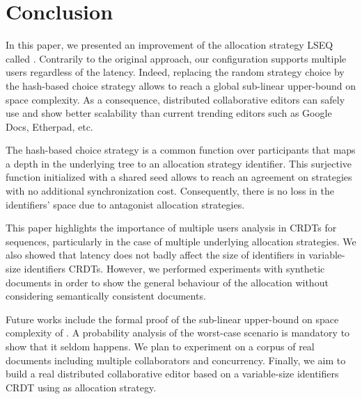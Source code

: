 
\section{Conclusion}

In this paper, we presented an improvement of the allocation strategy LSEQ
called \NAME{}. Contrarily to the original approach, our configuration supports
multiple users regardless of the latency. Indeed, replacing the random strategy
choice by the hash-based choice strategy allows to reach a global sub-linear
upper-bound on space complexity. As a consequence, distributed collaborative
editors can safely use \NAME{} and show better scalability than current
trending editors such as Google Docs, Etherpad, etc.

The hash-based choice strategy is a common function over participants that maps
a depth in the underlying tree to an allocation strategy identifier. This
surjective function initialized with a shared seed allows to reach an agreement
on strategies with no additional synchronization cost. Consequently, there is
no loss in the identifiers' space due to antagonist allocation strategies.

This paper highlights the importance of multiple users analysis in CRDTs for
sequences, particularly in the case of multiple underlying allocation
strategies. We also showed that latency does not badly affect the size of
identifiers in variable-size identifiers CRDTs. However, we performed
experiments with synthetic documents in order to show the general behaviour of
the allocation without considering semantically consistent documents.

Future works include the formal proof of the sub-linear upper-bound on space
complexity of \NAME{}. A probability analysis of the worst-case scenario is
mandatory to show that it seldom happens. We plan to experiment \NAME{} on a
corpus of real documents including multiple collaborators and
concurrency. Finally, we aim to build a real distributed collaborative editor
based on a variable-size identifiers CRDT using \NAME{} as allocation strategy.


